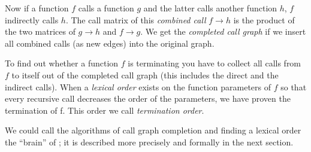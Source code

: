 Now if a function $f$ calls a function $g$ and the latter calls
another function $h$, $f$ indirectly calls $h$. The call matrix of
this {\em combined call} $f \rightarrow h$ is the product of the two
matrices of $g \rightarrow h$ and  $f \rightarrow g$. We get the
{\em completed call graph} if we insert all combined calls (as new
edges) into the original graph.

To find out whether a function $f$ is terminating you have to collect
all calls from $f$ to itself out of the completed call graph (this
includes the direct and the indirect calls). When a {\em lexical order}
exists on the function parameters of $f$ so that every recursive call
decreases the order of the parameters, we have proven the termination
of f. This order we call {\em termination order}.

We could call the algorithms of call graph completion and finding a
lexical order the ``brain'' of \foetus; it is described more precisely
and formally in the next section.

